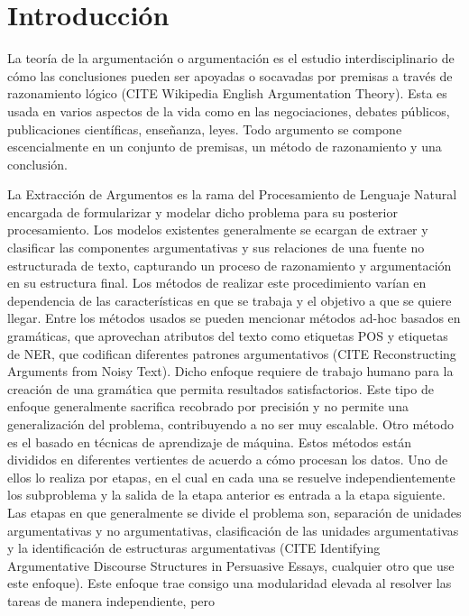 \chapter*{Introducción}\label{chapter:introduction}

La teoría de la argumentación o argumentación es el estudio interdisciplinario de cómo las conclusiones
pueden ser apoyadas o socavadas por premisas a través de razonamiento lógico (CITE Wikipedia English Argumentation Theory).
Esta es usada en varios aspectos de la vida como en las negociaciones, debates públicos, publicaciones
científicas, enseñanza, leyes. Todo argumento se compone escencialmente en un conjunto de premisas,
un método de razonamiento y una conclusión.


La Extracción de Argumentos es la rama del Procesamiento de Lenguaje Natural encargada de formularizar
y modelar dicho problema para su posterior procesamiento. Los modelos existentes generalmente se ecargan de
extraer y clasificar las componentes argumentativas y sus relaciones de una fuente no estructurada de 
texto, capturando un proceso de razonamiento y argumentación en su estructura final. Los métodos
de realizar este procedimiento varían en dependencia de las características en que se trabaja y el objetivo
a que se quiere llegar. Entre los métodos usados se pueden mencionar métodos ad-hoc basados en gramáticas,
que aprovechan atributos del texto como etiquetas POS y etiquetas de NER, que codifican diferentes 
patrones argumentativos (CITE Reconstructing Arguments from Noisy Text). Dicho enfoque requiere de trabajo 
humano para la creación de una gramática que permita resultados satisfactorios. Este tipo de enfoque
generalmente sacrifica recobrado por precisión y no permite una generalización del problema, contribuyendo
a no ser muy escalable. Otro método es el basado en técnicas de aprendizaje de máquina. Estos métodos están
divididos en diferentes vertientes de acuerdo a cómo procesan los datos. Uno de ellos lo realiza por
etapas, en el cual en cada una se resuelve independientemente los subproblema y la salida de la etapa 
anterior es entrada a la etapa siguiente. Las etapas en que generalmente se divide el problema
son, separación de unidades argumentativas y no argumentativas, clasificación de las unidades 
argumentativas y la identificación de estructuras argumentativas (CITE Identifying Argumentative Discourse Structures in Persuasive Essays, cualquier otro que use este enfoque).
Este enfoque trae consigo una modularidad elevada al resolver las tareas de manera independiente, pero
